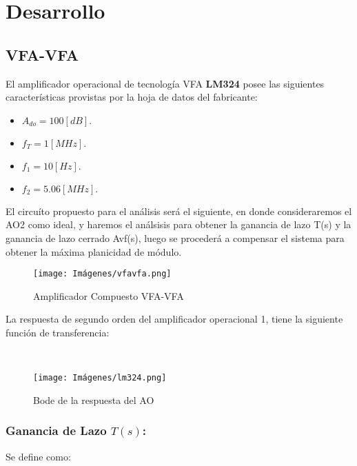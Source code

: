 \newpage

\section{Desarrollo}
\subsection{VFA-VFA}
El amplificador operacional de tecnología VFA \textbf{LM324} posee las siguientes características provistas por la hoja de datos del fabricante:\\

\begin{itemize}
    \item $A_{do} = 100 [dB].$
    \item $f_T = 1 [MHz].$
    \item $f_1 = 10 [Hz].$
    \item $f_2 = 5.06 [MHz].$
\end{itemize}

El circuíto propuesto para el análisis será el siguiente, en donde consideraremos el AO2 como ideal, y haremos el análsisis para obtener la ganancia de lazo T(s) y la ganancia de lazo cerrado Avf(s), luego se procederá a compensar el sistema para obtener la máxima planicidad de módulo.\\

\begin{figure}[ht]
    \centering
    \texttt{[image: Imágenes/vfavfa.png]}
    \caption{Amplificador Compuesto VFA-VFA}
\end{figure}

La respuesta de segundo orden del amplificador operacional 1, tiene la siguiente función de transferencia:\\

\begin{center}
    \\
\end{center}

\begin{figure}[ht]
    \centering
    \texttt{[image: Imágenes/lm324.png]}
    \caption{Bode de la respuesta del AO}
\end{figure}

\subsubsection{Ganancia de Lazo $T(s)$:}
Se define como:\\

